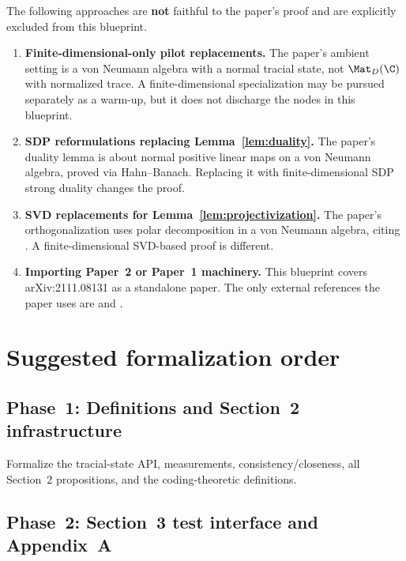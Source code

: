 The following approaches are \textbf{not} faithful to the paper's proof and are
explicitly excluded from this blueprint.

\begin{enumerate}
  \item \textbf{Finite-dimensional-only pilot replacements.}
    The paper's ambient setting is a von Neumann algebra with a normal tracial
    state, not $\Mat_D(\C)$ with normalized trace.
    A finite-dimensional specialization may be pursued
    separately as a warm-up, but it does not discharge the nodes in this blueprint.

  \item \textbf{SDP reformulations replacing Lemma~\ref{lem:duality}.}
    The paper's duality lemma is about normal positive linear maps on a von
    Neumann algebra, proved via Hahn--Banach.
    Replacing it with finite-dimensional SDP strong duality changes the proof.

  \item \textbf{SVD replacements for Lemma~\ref{lem:projectivization}.}
    The paper's orthogonalization uses polar decomposition in a von Neumann
    algebra, citing \cite{de2021orthogonalization}.
    A finite-dimensional SVD-based proof is different.

  \item \textbf{Importing Paper~2 or Paper~1 machinery.}
    This blueprint covers arXiv:2111.08131 as a standalone paper.
    The only external references the paper uses are
    \cite{de2021orthogonalization} and \cite{vidick2021almost}.
\end{enumerate}


\chapter{Suggested formalization order}
\label{chap:order}

\section{Phase~1: Definitions and Section~2 infrastructure}

Formalize the tracial-state API, measurements, consistency/closeness, all
Section~2 propositions, and the coding-theoretic definitions.

\section{Phase~2: Section~3 test interface and Appendix~A}

